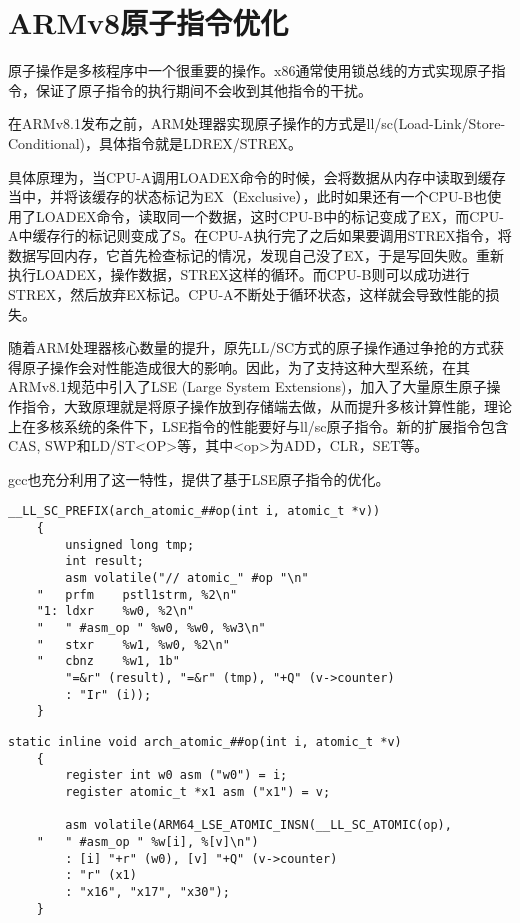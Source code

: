 \section{ARMv8原子指令优化}

原子操作是多核程序中一个很重要的操作。x86通常使用锁总线的方式实现原子指令，保证了原子指令的执行期间不会收到其他指令的干扰。

在ARMv8.1发布之前，ARM处理器实现原子操作的方式是ll/sc(Load-Link/Store-Conditional)，具体指令就是LDREX/STREX。

具体原理为，当CPU-A调用LOADEX命令的时候，会将数据从内存中读取到缓存当中，并将该缓存的状态标记为EX（Exclusive），此时如果还有一个CPU-B也使用了LOADEX命令，读取同一个数据，这时CPU-B中的标记变成了EX，而CPU-A中缓存行的标记则变成了S。在CPU-A执行完了之后如果要调用STREX指令，将数据写回内存，它首先检查标记的情况，发现自己没了EX，于是写回失败。重新执行LOADEX，操作数据，STREX这样的循环。而CPU-B则可以成功进行STREX，然后放弃EX标记。CPU-A不断处于循环状态，这样就会导致性能的损失。

随着ARM处理器核心数量的提升，原先LL/SC方式的原子操作通过争抢的方式获得原子操作会对性能造成很大的影响。因此，为了支持这种大型系统，在其ARMv8.1规范中引入了LSE (Large System Extensions)，加入了大量原生原子操作指令\cite{ArmArchitectureReference}，大致原理就是将原子操作放到存储端去做，从而提升多核计算性能，理论上在多核系统的条件下，LSE指令的性能要好与ll/sc原子指令。新的扩展指令包含CAS, SWP和LD/ST<OP>等，其中<op>为ADD，CLR，SET等。

gcc也充分利用了这一特性，提供了基于LSE原子指令的优化。

\begin{lstlisting}[caption={基于LL/SC的原子指令}]
    __LL_SC_PREFIX(arch_atomic_##op(int i, atomic_t *v))			
    {									
        unsigned long tmp;						
        int result;                               
        asm volatile("// atomic_" #op "\n"				
    "	prfm	pstl1strm, %2\n"    
    "1:	ldxr	%w0, %2\n"    
    "	" #asm_op "	%w0, %w0, %w3\n"     				
    "	stxr	%w1, %w0, %2\n"     
    "	cbnz	%w1, 1b"	   
        "=&r" (result), "=&r" (tmp), "+Q" (v->counter)	
        : "Ir" (i));
    }
\end{lstlisting}

\begin{lstlisting}[caption={基于LSE的原子指令}]
    static inline void arch_atomic_##op(int i, atomic_t *v)			
    {									
        register int w0 asm ("w0") = i;					
        register atomic_t *x1 asm ("x1") = v;				
                                        
        asm volatile(ARM64_LSE_ATOMIC_INSN(__LL_SC_ATOMIC(op),		
    "	" #asm_op "	%w[i], %[v]\n")					
        : [i] "+r" (w0), [v] "+Q" (v->counter) 				
        : "r" (x1)   					
        : "x16", "x17", "x30");  					
    }
\end{lstlisting}

